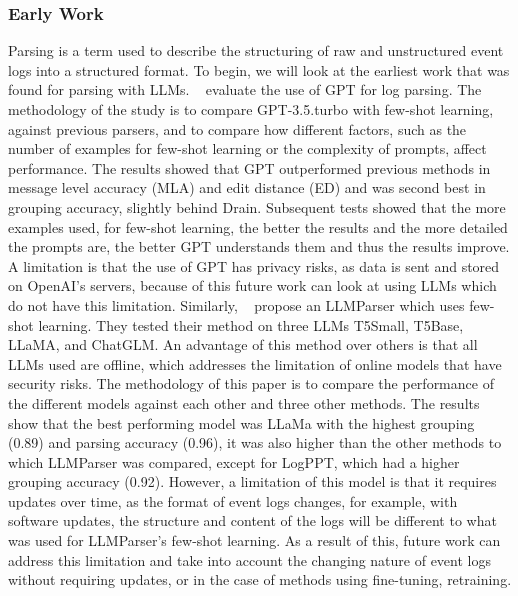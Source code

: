 \subsubsection{Early Work}
Parsing is a term used to describe the structuring of raw and unstructured event logs into a structured format. To begin, we will look at the earliest work that was found for parsing with LLMs. ~\cite{le2023log} evaluate the use of GPT for log parsing. The methodology of the study is to compare GPT-3.5.turbo with few-shot learning, against previous parsers, and to compare how different factors, such as the number of examples for few-shot learning or the complexity of prompts, affect performance. The results showed that GPT outperformed previous methods in message level accuracy (MLA) and edit distance (ED) and was second best in grouping accuracy, slightly behind Drain. Subsequent tests showed that the more examples used, for few-shot learning, the better the results and the more detailed the prompts are, the better GPT understands them and thus the results improve. A limitation is that the use of GPT has privacy risks, as data is sent and stored on OpenAI's servers, because of this future work can look at using LLMs which do not have this limitation. Similarly, ~\cite{ma2024llmparser} propose an LLMParser which uses few-shot learning. They tested their method on three LLMs T5Small, T5Base, LLaMA, and ChatGLM. An advantage of this method over others is that all LLMs used are offline, which addresses the limitation of online models that have security risks. The methodology of this paper is to compare the performance of the different models against each other and three other methods. The results show that the best performing model was LLaMa with the highest grouping (0.89) and parsing accuracy (0.96), it was also higher than the other methods to which LLMParser was compared, except for LogPPT, which had a higher grouping accuracy (0.92). However, a limitation of this model is that it requires updates over time, as the format of event logs changes, for example, with software updates, the structure and content of the logs will be different to what was used for LLMParser's few-shot learning. As a result of this, future work can address this limitation and take into account the changing nature of event logs without requiring updates, or in the case of methods using fine-tuning, retraining. 

